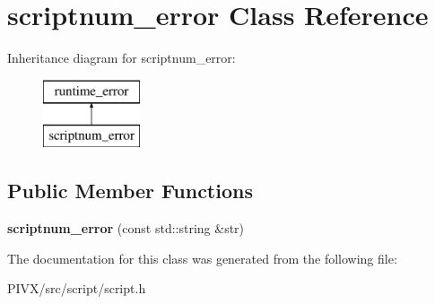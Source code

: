 \hypertarget{classscriptnum__error}{}\section{scriptnum\+\_\+error Class Reference}
\label{classscriptnum__error}
Inheritance diagram for scriptnum\+\_\+error\+:\begin{figure}[H]
\begin{center}
\leavevmode
\includegraphics[height=2.000000cm]{classscriptnum__error}
\end{center}
\end{figure}
\subsection*{Public Member Functions}
\begin{DoxyCompactItemize}
\item 
\mbox{\label{classscriptnum__error_ae7542abbcec27eb624e8eb8ebefd3d8e}} 
{\bfseries scriptnum\+\_\+error} (const std\+::string \&str)
\end{DoxyCompactItemize}


The documentation for this class was generated from the following file\+:\begin{DoxyCompactItemize}
\item 
P\+I\+V\+X/src/script/script.\+h\end{DoxyCompactItemize}
